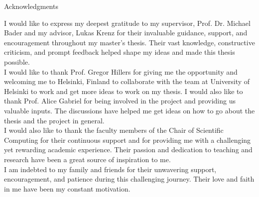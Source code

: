 \thispagestyle{empty}

\vspace*{20mm}

\begin{center}
    { Acknowledgments}
\end{center}

\vspace{10mm}

I would like to express my deepest gratitude to my supervisor, Prof. Dr. Michael Bader and my advisor, Lukas Krenz 
for their invaluable guidance, support, and encouragement throughout my master's thesis. 
Their vast knowledge, constructive criticism, and prompt feedback helped shape my ideas and made this thesis possible. \\

I would like to thank Prof. Gregor Hillers for giving me the opportunity and welcoming me to Helsinki, Finland to collaborate with the team at University of Helsinki
to work and get more ideas to work on my thesis. I would also like to thank Prof. Alice Gabriel for being involved in the project and providing us valuable inputs.
The discussions have helped me get ideas on how to go about the thesis and the project in general.\\

I would also like to thank the faculty members of the Chair of Scientific Computing for their continuous support and for providing 
me with a challenging yet rewarding academic experience. Their passion and dedication to teaching and research have been a 
great source of inspiration to me. \\

I am indebted to my family and friends for their unwavering support, encouragement, and patience during this challenging 
journey. Their love and faith in me have been my constant motivation. \\

\cleardoublepage{}
